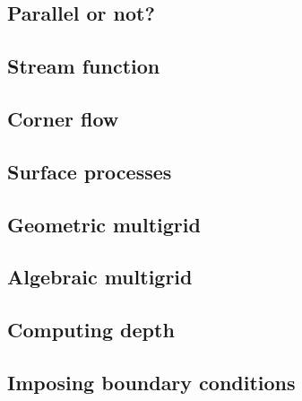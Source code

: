 \documentclass[a4paper]{article}
\begin{document}
\subsection{Parallel or not?} \label{sec:parallel}  %
\newpage %
\subsection{Stream function} \label{sec:streamfunction}  %
\newpage %
\subsection{Corner flow} \label{sec:cornerflow}  %
\newpage %
\subsection{Surface processes \label{sec:surfaceprocesses}}  %
\newpage %
\subsection{Geometric multigrid}  %
\newpage %
\subsection{Algebraic multigrid}  %
\newpage %
\subsection{Computing depth \label{ss:depth}}  %
\newpage %
\subsection{Imposing boundary conditions \label{ss:howtobc}}  %
\newpage %
\end{document}
